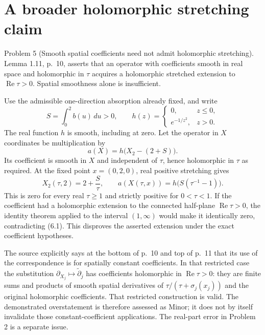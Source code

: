 \documentclass[10pt]{article}
\begin{document}
\section*{A broader holomorphic stretching claim}
Problem 5 (Smooth spatial coefficients need not admit holomorphic stretching).  Lemma 1.11, p. 10, asserts that an operator with coefficients smooth in real space and holomorphic in \(\tau\) acquires a holomorphic stretched extension to \(\operatorname{Re}\tau>0\). Spatial smoothness alone is insufficient.\par
Use the admissible one-direction absorption already fixed, and write \[S=\int_0^2 b(u)\,du>0,\qquad
 h(z)=
 \begin{cases}
  0,&z\le0,\\
  e^{-1/z^2},&z>0.
 \end{cases}\] The real function \(h\) is smooth, including at zero. Let the operator in \(X\) coordinates be multiplication by \[a(X)=h\bigl(X_2-(2+S)\bigr).\] Its coefficient is smooth in \(X\) and independent of \(\tau\), hence holomorphic in \(\tau\) as required. At the fixed point \(x=(0,2,0)\), real positive stretching gives \[X_2(\tau,2)=2+\frac S\tau,\qquad
 a(X(\tau,x))=h\bigl(S(\tau^{-1}-1)\bigr).
 \tag{6.1}\] This is zero for every real \(\tau\ge1\) and strictly positive for \(0<\tau<1\). If the coefficient had a holomorphic extension to the connected half-plane \(\operatorname{Re}\tau>0\), the identity theorem applied to the interval \((1,\infty)\) would make it identically zero, contradicting (6.1). This disproves the asserted extension under the exact coefficient hypotheses.\par
The source explicitly says at the bottom of p. 10 and top of p. 11 that its use of the correspondence is for spatially constant coefficients. In that restricted case the substitution \(\partial_{X_j}\mapsto\widetilde\partial_j\) has coefficients holomorphic in \(\operatorname{Re}\tau>0\): they are finite sums and products of smooth spatial derivatives of \(\tau/(\tau+\sigma_j(x_j))\) and the original holomorphic coefficients. That restricted construction is valid. The demonstrated overstatement is therefore assessed as Minor; it does not by itself invalidate those constant-coefficient applications. The real-part error in Problem 2 is a separate issue.\par
\end{document}
